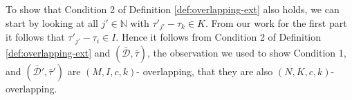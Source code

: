 To show that Condition 2 of Definition \ref{def:overlapping-ext} also holds, we can start by looking at all $j' \in \mathbb{N}$ with $\tau'_{j'} - \tau_k \in K$.
From our work for the first part it follows that $\tau'_{j'} - \tau_i \in I$.
Hence it follows from Condition 2 of Definition \ref{def:overlapping-ext} and $(\bar{\mathcal{D}}, \bar{\tau})$, the observation we used to show Condition 1, and $(\bar{\mathcal{D}}', \bar{\tau}')$ are $(M,I,c,k)$- overlapping, that they are also $(N,K,c,k)$- overlapping.






